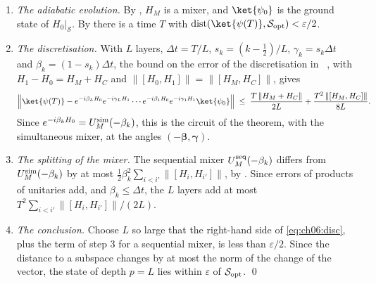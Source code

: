 \documentclass[handoutsbeamer.tex]{subfiles}
\begin{document}
\begin{frame}
\onp{\scriptsize}
\begin{enumerate}\setlength\itemsep{0.15em}
    \item \emph{The adiabatic evolution.} By , $H_M$ is a mixer, and $\ket{\psi_0}$ is the ground state of $H_0|_{\mathcal S}$. By  there is a time $T$ with $\dist(\ket{\psi(T)},\mathcal S_{\rm opt})<\varepsilon/2$.
    \item \emph{The discretisation.} With $L$ layers, $\Delta t = T/L$, $s_k = (k-\frac12)/L$, $\gamma_k = s_k\Delta t$ and $\beta_k = (1-s_k)\Delta t$, the bound on the error of the discretisation in \Chap~, with $H_1 - H_0 = H_M + H_C$ and $\|[H_0,H_1]\| = \|[H_M,H_C]\|$, gives
    \begin{equation}\label{eq:ch06:disc}
        \Big\|\ket{\psi(T)} - e^{-i\beta_LH_0}e^{-i\gamma_LH_1}\cdots e^{-i\beta_1H_0}e^{-i\gamma_1H_1}\ket{\psi_0}\Big\| \;\le\; \frac{T\,\|H_M + H_C\|}{2L} + \frac{T^2\,\|[H_M,H_C]\|}{8L}.
    \end{equation}
    Since $e^{-i\beta_kH_0} = U_M^{\rm sim}(-\beta_k)$, this is the circuit of the theorem, with the simultaneous mixer, at the angles $(-\boldsymbol\beta,\boldsymbol\gamma)$.
    \item \emph{The splitting of the mixer.} The sequential mixer $U_M^{\rm seq}(-\beta_k)$ differs from $U_M^{\rm sim}(-\beta_k)$ by at most $\frac12\beta_k^2\sum_{i<i'}\|[H_i,H_{i'}]\|$, by . Since errors of products of unitaries add, and $\beta_k\le\Delta t$, the $L$ layers add at most $T^2\sum_{i<i'}\|[H_i,H_{i'}]\|/(2L)$.
    \item \emph{The conclusion.} Choose $L$ so large that the right-hand side of \eqref{eq:ch06:disc}, plus the term of step 3 for a sequential mixer, is less than $\varepsilon/2$. Since the distance to a subspace changes by at most the norm of the change of the vector, the state of depth $p = L$ lies within $\varepsilon$ of $\mathcal S_{\rm opt}$. \qed
\end{enumerate}
\end{frame}
\end{document}
